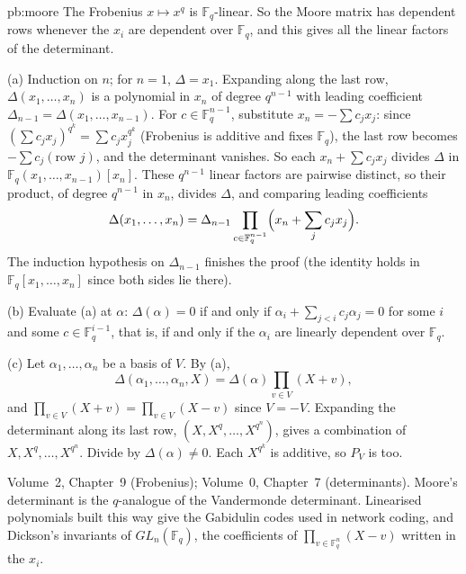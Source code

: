 \begin{solution}{pb:moore}
\idea The Frobenius $x\mapsto x^q$ is $\mathbb F_q$-linear. So the Moore matrix has dependent rows whenever the $x_i$ are
dependent over $\mathbb F_q$, and this gives all the linear factors of the determinant.

\writeup (a) Induction on $n$; for $n=1$, $\Delta=x_1$. Expanding along the last row, $\Delta(x_1,\dots,x_n)$ is a polynomial in
$x_n$ of degree $q^{n-1}$ with leading coefficient $\Delta_{n-1}=\Delta(x_1,\dots,x_{n-1})$. For $c\in\mathbb F_q^{n-1}$, substitute
$x_n=-\sum c_jx_j$: since $(\sum c_jx_j)^{q^k}=\sum c_jx_j^{q^k}$ (Frobenius is additive and fixes $\mathbb F_q$), the last row becomes
$-\sum c_j(\text{row }j)$, and the determinant vanishes. So each $x_n+\sum c_jx_j$ divides $\Delta$ in
$\mathbb F_q(x_1,\dots,x_{n-1})[x_n]$. These $q^{n-1}$ linear factors are pairwise distinct, so their product, of degree $q^{n-1}$ in
$x_n$, divides $\Delta$, and comparing leading coefficients
\[
\Delta(x_1,\dots,x_n)=\Delta_{n-1}\prod_{c\in\mathbb F_q^{n-1}}\Bigl(x_n+\sum_jc_jx_j\Bigr).
\]
The induction hypothesis on $\Delta_{n-1}$ finishes the proof (the identity holds in $\mathbb F_q[x_1,\dots,x_n]$ since both sides lie
there).

(b) Evaluate (a) at $\alpha$: $\Delta(\alpha)=0$ if and only if $\alpha_i+\sum_{j<i}c_j\alpha_j=0$ for some $i$ and some
$c\in\mathbb F_q^{i-1}$, that is, if and only if the $\alpha_i$ are linearly dependent over $\mathbb F_q$.

(c) Let $\alpha_1,\dots,\alpha_n$ be a basis of $V$. By (a),
\[
\Delta(\alpha_1,\dots,\alpha_n,X)=\Delta(\alpha)\prod_{v\in V}(X+v),
\]
and $\prod_{v\in V}(X+v)=\prod_{v\in V}(X-v)$ since $V=-V$. Expanding the determinant along its last row, $(X,X^q,\dots,X^{q^n})$,
gives a combination of $X,X^q,\dots,X^{q^n}$. Divide by $\Delta(\alpha)\ne0$. Each $X^{q^k}$ is additive, so $P_V$ is too.

\tools Volume~2, Chapter~9 (Frobenius); Volume~0, Chapter~7 (determinants).
\leads Moore's determinant is the $q$-analogue of the Vandermonde determinant. Linearised polynomials built this way give the
Gabidulin codes used in network coding, and Dickson's invariants of $GL_n(\mathbb F_q)$, the coefficients of
$\prod_{v\in\mathbb F_q^n}(X-v)$ written in the $x_i$.
\end{solution}

